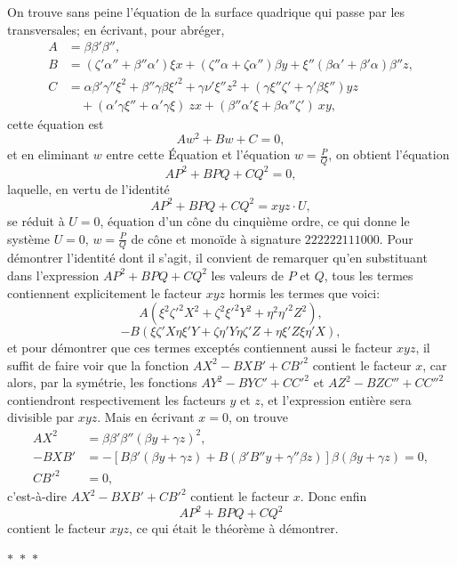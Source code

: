 \documentclass[11pt,a4paper]{article}
\newcommand{\asterism}{\par\begin{center}$\ast$~$\ast$~$\ast$\end{center}\par}
\begin{document}
On trouve sans peine l'\'{e}quation de la surface quadrique qui passe par les transversales; en \'{e}crivant, pour abr\'{e}ger,
\begin{align*}
A &= \beta\beta'\beta'', \\
B &= (\zeta'\alpha'' + \beta''\alpha')\xi x + (\zeta''\alpha + \zeta\alpha'')\beta y + \xi''(\beta\alpha' + \beta'\alpha)\beta''z, \\
C &= \alpha\beta'\gamma''\xi^2 + \beta''\gamma\beta\xi'^2 + \gamma\nu'\xi''z^2 + (\gamma\xi''\zeta' + \gamma'\beta\xi'')yz \\
&\quad + (\alpha'\gamma\xi'' + \alpha'\gamma\xi)\ zx + (\beta''\alpha'\xi + \beta\alpha''\zeta')\ xy,
\end{align*}
cette \'{e}quation est
\[
Aw^2 + Bw + C = 0,
\]
et en eliminant $w$ entre cette \'{E}quation et l'\'{e}quation $w = \frac{P}{Q}$, on obtient l'\'{e}quation
\[
AP^2 + BPQ + CQ^2 = 0,
\]
laquelle, en vertu de l'identit\'{e}
\[
AP^2 + BPQ + CQ^2 = xyz \cdot U,
\]
se r\'{e}duit \`{a} $U = 0$, \'{e}quation d'un c\^{o}ne du cinqui\`{e}me ordre, ce qui donne le syst\`{e}me $U = 0$, $w = \frac{P}{Q}$ de c\^{o}ne et mono\"{i}de \`{a} signature $222222111000$. Pour d\'{e}montrer l'identit\'{e} dont il s'agit, il convient de remarquer qu'en substituant dans l'expression $AP^2 + BPQ + CQ^2$ les valeurs de $P$ et $Q$, tous les termes contiennent explicitement le facteur $xyz$ hormis les termes que voici:
\[
A(\xi^2\zeta'^2 X^2 + \zeta^2\xi'^2 Y^2 + \eta^2\eta'^2 Z^2),
\]
\[
-B(\xi\zeta'X\eta\xi'Y + \zeta\eta'Y\eta\zeta'Z + \eta\xi'Z\xi\eta'X),
\]
et pour d\'{e}montrer que ces termes except\'{e}s contiennent aussi le facteur $xyz$, il suffit de faire voir que la fonction $AX^2 - BXB' + CB'^2$ contient le facteur $x$, car alors, par la sym\'{e}trie, les fonctions $AY^2 - BYC' + CC'^2$ et $AZ^2 - BZC'' + CC''^2$ contiendront respectivement les facteurs $y$ et $z$, et l'expression enti\`{e}re sera divisible par $xyz$. Mais en \'{e}crivant $x = 0$, on trouve
\begin{align*}
AX^2 &= \beta\beta'\beta''(\beta y + \gamma z)^2, \\
-BXB' &= -[B\beta'(\beta y + \gamma z) + B(\beta'B''y + \gamma''\beta z)]\beta(\beta y + \gamma z) = 0, \\
CB'^2 &= 0,
\end{align*}
c'est-\`{a}-dire $AX^2 - BXB' + CB'^2$ contient le facteur $x$. Donc enfin
\[
AP^2 + BPQ + CQ^2
\]
contient le facteur $xyz$, ce qui \'{e}tait le th\'{e}or\`{e}me \`{a} d\'{e}montrer.

\asterism

\clearpage
\end{document}
